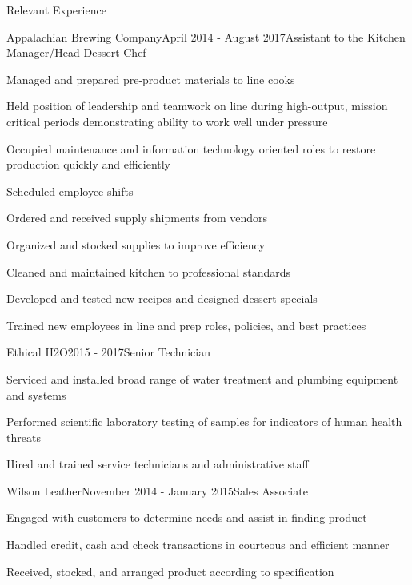 \documentclass{resume} %
\begin{document}
\begin{rSection}{Relevant Experience}

\begin{rWorkSubsection}{Appalachian Brewing Company}{April 2014 - August 2017}{Assistant to the Kitchen Manager/Head Dessert Chef}{}
\item Managed and prepared pre-product materials to line cooks
\item Held position of leadership and teamwork on line during high-output, mission critical periods demonstrating ability to work well under pressure
\item Occupied maintenance and information technology oriented roles to restore production quickly and efficiently
\item Scheduled employee shifts
\item Ordered and received supply shipments from vendors
\item Organized and stocked supplies to improve efficiency
\item Cleaned and maintained kitchen to professional standards
\item Developed and tested new recipes and designed dessert specials
\item Trained new employees in line and prep roles, policies, and best practices
\end{rWorkSubsection}
\fi

\begin{rWorkSubsection}{Ethical H2O}{2015 - 2017}{Senior Technician}{}
\item Serviced and installed broad range of water treatment and plumbing equipment and systems
\item Performed scientific laboratory testing of samples for indicators of human health threats
\item Hired and trained service technicians and administrative staff
\end{rWorkSubsection}

\iffalse
\begin{rWorkSubsection}{Wilson Leather}{November 2014 - January 2015}{Sales Associate}{}
\item Engaged with customers to determine needs and assist in finding product
\item Handled credit, cash and check transactions in courteous and efficient manner
\item Received, stocked, and arranged product according to specification
\end{rWorkSubsection}


\end{rSection}
\end{document}
